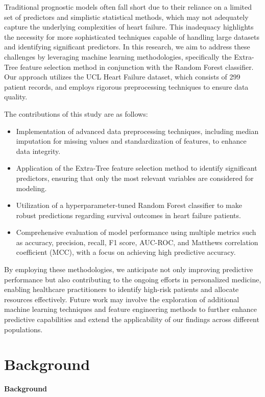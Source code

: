 \documentclass{article}
\begin{document}
Traditional prognostic models often fall short due to their reliance on a limited set of predictors and simplistic statistical methods, which may not adequately capture the underlying complexities of heart failure. This inadequacy highlights the necessity for more sophisticated techniques capable of handling large datasets and identifying significant predictors. In this research, we aim to address these challenges by leveraging machine learning methodologies, specifically the Extra-Tree feature selection method in conjunction with the Random Forest classifier. Our approach utilizes the UCL Heart Failure dataset, which consists of 299 patient records, and employs rigorous preprocessing techniques to ensure data quality.

The contributions of this study are as follows:

\begin{itemize}
    \item Implementation of advanced data preprocessing techniques, including median imputation for missing values and standardization of features, to enhance data integrity.
    \item Application of the Extra-Tree feature selection method to identify significant predictors, ensuring that only the most relevant variables are considered for modeling.
    \item Utilization of a hyperparameter-tuned Random Forest classifier to make robust predictions regarding survival outcomes in heart failure patients.
    \item Comprehensive evaluation of model performance using multiple metrics such as accuracy, precision, recall, F1 score, AUC-ROC, and Matthews correlation coefficient (MCC), with a focus on achieving high predictive accuracy.
\end{itemize}

By employing these methodologies, we anticipate not only improving predictive performance but also contributing to the ongoing efforts in personalized medicine, enabling healthcare practitioners to identify high-risk patients and allocate resources effectively. Future work may involve the exploration of additional machine learning techniques and feature engineering methods to further enhance predictive capabilities and extend the applicability of our findings across different populations.

\section{Background}
\textbf{Background}
\end{document}
